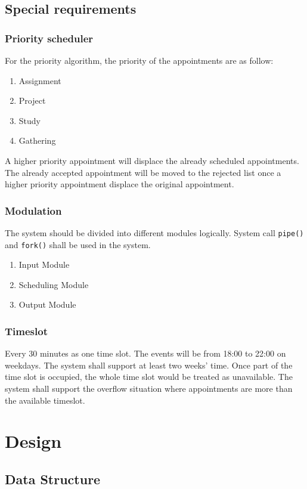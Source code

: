 \documentclass[12pt,a4paper]{report}
\begin{document}
\section{Special requirements}
\subsection{Priority scheduler}
For the priority algorithm, the priority of the appointments are as follow:
\label{Requirement:Priority}
\begin{enumerate}
\item Assignment
\item Project
\item Study
\item Gathering
\end{enumerate}
A higher priority appointment will displace the already scheduled appointments. The already accepted appointment will be moved to the rejected list once a higher priority appointment displace the original appointment.

\subsection{Modulation}
The system should be divided into different modules logically. System call \texttt{pipe()} and \texttt{fork()} shall be used in the system.
\begin{enumerate}
\item Input Module
\item Scheduling Module
\item Output Module
\end{enumerate}

\subsection{Timeslot}
Every 30 minutes as one time slot. The events will be from 18:00 to 22:00 on weekdays. The system shall support at least two weeks' time. Once part of the time slot is occupied, the whole time slot would be treated as unavailable. The system shall support the overflow situation where appointments are more than the available timeslot.

\chapter{Design}
\section{Data Structure}
\end{document}
